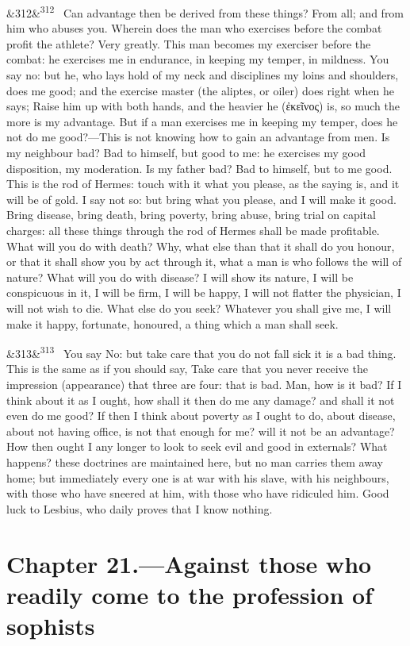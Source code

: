 \documentclass[12pt]{article}
\newcommand{\para}[1][]{\par\noindent\ifx&#1&\else\textsuperscript{\footnotesize #1}~\fi}
\begin{document}
\para[312] Can advantage then be derived from these things? From all; and from him who abuses you. Wherein does the man who exercises before the combat profit the athlete? Very greatly. This man becomes my exerciser before the combat: he exercises me in endurance, in keeping my temper, in mildness. You say no: but he, who lays hold of my neck and disciplines my loins and shoulders, does me good; and the exercise master (the aliptes, or oiler) does right when he says; Raise him up with both hands, and the heavier he (ἐκεῖνος) is, so much the more is my advantage. But if a man exercises me in keeping my temper, does he not do me good?—This is not knowing how to gain an advantage from men. Is my neighbour bad? Bad to himself, but good to me: he exercises my good disposition, my moderation. Is my father bad? Bad to himself, but to me good. This is the rod of Hermes: touch with it what you please, as the saying is, and it will be of gold. I say not so: but bring what you please, and I will make it good. Bring disease, bring death, bring poverty, bring abuse, bring trial on capital charges: all these things through the rod of Hermes shall be made profitable. What will you do with death? Why, what else than that it shall do you honour, or that it shall show you by act through it, what a man is who follows the will of nature? What will you do with disease? I will show its nature, I will be conspicuous in it, I will be firm, I will be happy, I will not flatter the physician, I will not wish to die. What else do you seek? Whatever you shall give me, I will make it happy, fortunate, honoured, a thing which a man shall seek.

\para[313] You say No: but take care that you do not fall sick it is a bad thing. This is the same as if you should say, Take care that you never receive the impression (appearance) that three are four: that is bad. Man, how is it bad? If I think about it as I ought, how shall it then do me any damage? and shall it not even do me good? If then I think about poverty as I ought to do, about disease, about not having office, is not that enough for me? will it not be an advantage? How then ought I any longer to look to seek evil and good in externals? What happens? these doctrines are maintained here, but no man carries them away home; but immediately every one is at war with his slave, with his neighbours, with those who have sneered at him, with those who have ridiculed him. Good luck to Lesbius, who daily proves that I know nothing.

\section*{Chapter 21.---Against those who readily come to the profession of sophists}
\end{document}
